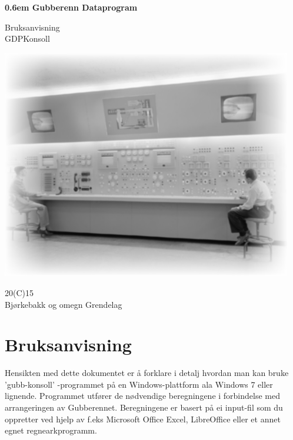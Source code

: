 \documentclass[12pt]{book}
\begin{document}
\clearpage

\newcommand\nbvspace[1][3]{\vspace*{\stretch{#1}}}
\newcommand\nbstretchyspace{\spaceskip0.5em plus 0.25em minus 0.25em}
\newcommand{\nbtitlestretch}{\spaceskip0.6em}
\pagestyle{empty}
\begin{center}
\bfseries
\nbvspace[1]
\Huge
{\nbtitlestretch\huge
Gubberenn Dataprogram \\}

\nbvspace[10]
\normalsize

Bruksanvisning\\
GDPKonsoll\\

\nbvspace[2]

\includegraphics[width=5.0in]{gubb}
\nbvspace[15]
\normalsize

20(C)15\\
\large
Bjørkebakk og omegn Grendelag
\nbvspace[1]
\end{center}

\tableofcontents




\chapter{Bruksanvisning}

Hensikten med dette dokumentet er å forklare i detalj hvordan man kan bruke 'gubb-konsoll' -programmet på en Windows-plattform ala Windows 7 eller lignende. Programmet utfører de nødvendige beregningene i forbindelse med arrangeringen av Gubberennet. Beregningene er basert på ei input-fil som du oppretter ved hjelp av f.eks Microsoft Office Excel,  LibreOffice eller et annet egnet regnearkprogramm. 
\end{document}
